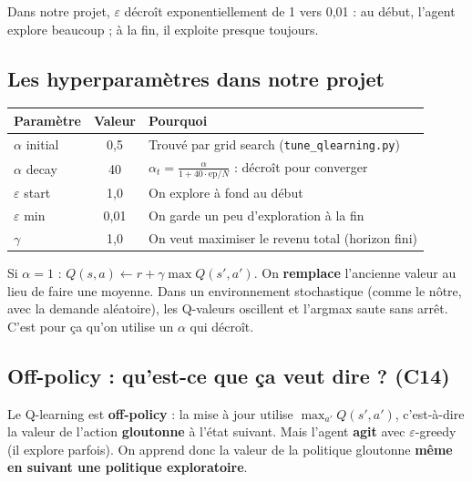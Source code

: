 \documentclass[11pt,a4paper]{article}
\begin{document}
Dans notre projet, $\varepsilon$ décroît exponentiellement de 1 vers 0{,}01 :
au début, l'agent explore beaucoup ; à la fin, il exploite presque toujours.

\subsection{Les hyperparamètres dans notre projet}

\begin{table}[h]
\centering
\begin{tabular}{@{}lcp{7cm}@{}}
\toprule
\textbf{Paramètre} & \textbf{Valeur} & \textbf{Pourquoi} \\
\midrule
$\alpha$ initial & 0{,}5 & Trouvé par grid search (\texttt{tune\_qlearning.py}) \\
$\alpha$ decay & 40 & $\alpha_t = \frac{\alpha}{1 + 40 \cdot \text{ep}/N}$ : décroît pour converger \\
$\varepsilon$ start & 1{,}0 & On explore à fond au début \\
$\varepsilon$ min & 0{,}01 & On garde un peu d'exploration à la fin \\
$\gamma$ & 1{,}0 & On veut maximiser le revenu total (horizon fini) \\
\bottomrule
\end{tabular}
\end{table}

\begin{warnbox}[Piège : $\alpha = 1$ ne converge pas]
Si $\alpha = 1$ : $Q(s,a) \leftarrow r + \gamma \max Q(s',a')$. On \textbf{remplace} l'ancienne valeur au lieu de faire une moyenne. Dans un environnement stochastique (comme le nôtre, avec la demande aléatoire), les Q-valeurs oscillent et l'argmax saute sans arrêt. C'est pour ça qu'on utilise un $\alpha$ qui décroît.
\end{warnbox}

\subsection{Off-policy : qu'est-ce que ça veut dire ? (C14)}

Le Q-learning est \textbf{off-policy} : la mise à jour utilise $\max_{a'} Q(s', a')$, c'est-à-dire la valeur de l'action \textbf{gloutonne} à l'état suivant. Mais l'agent \textbf{agit} avec $\varepsilon$-greedy (il explore parfois). On apprend donc la valeur de la politique gloutonne \textbf{même en suivant une politique exploratoire}.
\end{document}
